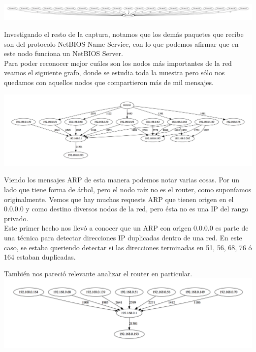 \includegraphics[scale=0.25,clip=true,trim=700 0 720 0]{graphics/t-work-ip-169-254-255-255.png}

\indent Investigando el resto de la captura, notamos que los demás paquetes que recibe son del protocolo NetBIOS Name Service, con lo que podemos afirmar que en este nodo funciona un NetBIOS Server.\\
\indent Para poder reconocer mejor cuáles son los nodos más importantes de la red veamos el siguiente grafo, donde se estudia toda la muestra pero sólo nos quedamos con aquellos nodos que compartieron más de mil mensajes.\newline

\includegraphics[scale=0.30]{graphics/t-work-all-1000w.png}

\indent Viendo los mensajes ARP de esta manera podemos notar varias cosas. Por un lado que tiene forma de árbol, pero el nodo raíz no es el router, como suponíamos originalmente. Vemos que hay muchos requests ARP que tienen origen en el 0.0.0.0 y como destino diversos nodos de la red, pero ésta no es una IP del rango privado.\\
\indent Este primer hecho nos llevó a conocer que un ARP con origen 0.0.0.0 es parte de una técnica para detectar direcciones IP duplicadas dentro de una red. En este caso, se estaba queriendo detectar si las direcciones terminadas en 51, 56, 68, 76 ó 164 estaban duplicadas.\\

\newpage

\indent También nos pareció relevante analizar el router en particular.\\

\includegraphics[scale=0.3]{graphics/t-work-router-1000w.png}

